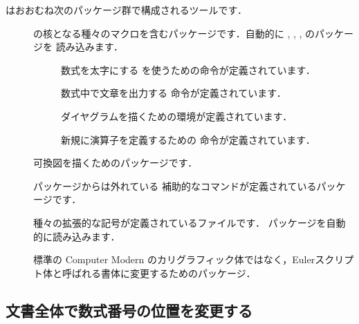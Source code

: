 \AmSLaTeX はおおむね次のパッケージ群で構成されるツールです．
\begin{description}
 \item[]
 \AmSLaTeX の核となる種々のマクロを含むパッケージです．自動的に
 , , , のパッケージを
 読み込みます．
\begin{description}
\item[] 
  数式を太字にする を使うための命令が定義されています．
\item[] 
  数式中で文章を出力する 命令が定義されています．
\item[]  
 ダイヤグラムを描くための環境が定義されています．
\item[]
  新規に演算子を定義するための 
  命令が定義されています．
\end{description}
 \item[] 可換図を描くためのパッケージです．
 \item[] パッケージからは外れている
 補助的なコマンドが定義されているパッケージです．
 \item[] 種々の拡張的な記号が定義されているファイルです．
 パッケージを自動的に読み込みます．
\begin{comment}
 \item[\Y{amsthm}] \env{theorem}環境の拡張をするパッケージです．
 \E{proof}%
 環境と『証明終わり (\Z{Q.E.D.})』を表す記号 \C{qedsymbol} がすでに定義され
 ています．
\end{comment}
 \item[]%
 標準の Computer Modern のカリグラフィック体ではなく，Eulerスクリプト体と呼ばれる書体に変更するためのパッケージ．
\end{description}


\subsection{文書全体で数式番号の位置を変更する}

